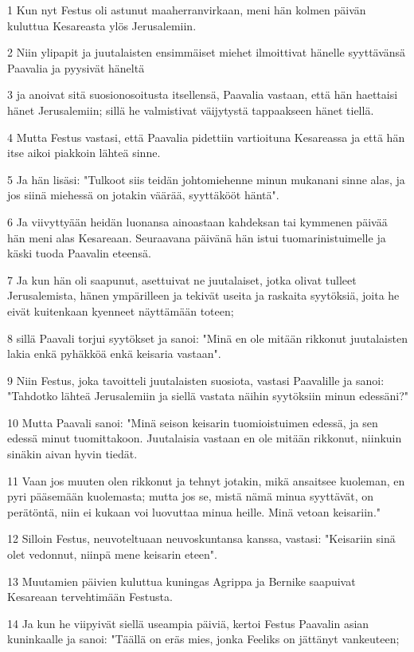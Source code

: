 \par 1 Kun nyt Festus oli astunut maaherranvirkaan, meni hän kolmen päivän kuluttua Kesareasta ylös Jerusalemiin.
\par 2 Niin ylipapit ja juutalaisten ensimmäiset miehet ilmoittivat hänelle syyttävänsä Paavalia ja pyysivät häneltä
\par 3 ja anoivat sitä suosionosoitusta itsellensä, Paavalia vastaan, että hän haettaisi hänet Jerusalemiin; sillä he valmistivat väijytystä tappaakseen hänet tiellä.
\par 4 Mutta Festus vastasi, että Paavalia pidettiin vartioituna Kesareassa ja että hän itse aikoi piakkoin lähteä sinne.
\par 5 Ja hän lisäsi: "Tulkoot siis teidän johtomiehenne minun mukanani sinne alas, ja jos siinä miehessä on jotakin väärää, syyttäkööt häntä".
\par 6 Ja viivyttyään heidän luonansa ainoastaan kahdeksan tai kymmenen päivää hän meni alas Kesareaan. Seuraavana päivänä hän istui tuomarinistuimelle ja käski tuoda Paavalin eteensä.
\par 7 Ja kun hän oli saapunut, asettuivat ne juutalaiset, jotka olivat tulleet Jerusalemista, hänen ympärilleen ja tekivät useita ja raskaita syytöksiä, joita he eivät kuitenkaan kyenneet näyttämään toteen;
\par 8 sillä Paavali torjui syytökset ja sanoi: "Minä en ole mitään rikkonut juutalaisten lakia enkä pyhäkköä enkä keisaria vastaan".
\par 9 Niin Festus, joka tavoitteli juutalaisten suosiota, vastasi Paavalille ja sanoi: "Tahdotko lähteä Jerusalemiin ja siellä vastata näihin syytöksiin minun edessäni?"
\par 10 Mutta Paavali sanoi: "Minä seison keisarin tuomioistuimen edessä, ja sen edessä minut tuomittakoon. Juutalaisia vastaan en ole mitään rikkonut, niinkuin sinäkin aivan hyvin tiedät.
\par 11 Vaan jos muuten olen rikkonut ja tehnyt jotakin, mikä ansaitsee kuoleman, en pyri pääsemään kuolemasta; mutta jos se, mistä nämä minua syyttävät, on perätöntä, niin ei kukaan voi luovuttaa minua heille. Minä vetoan keisariin."
\par 12 Silloin Festus, neuvoteltuaan neuvoskuntansa kanssa, vastasi: "Keisariin sinä olet vedonnut, niinpä mene keisarin eteen".
\par 13 Muutamien päivien kuluttua kuningas Agrippa ja Bernike saapuivat Kesareaan tervehtimään Festusta.
\par 14 Ja kun he viipyivät siellä useampia päiviä, kertoi Festus Paavalin asian kuninkaalle ja sanoi: "Täällä on eräs mies, jonka Feeliks on jättänyt vankeuteen;

